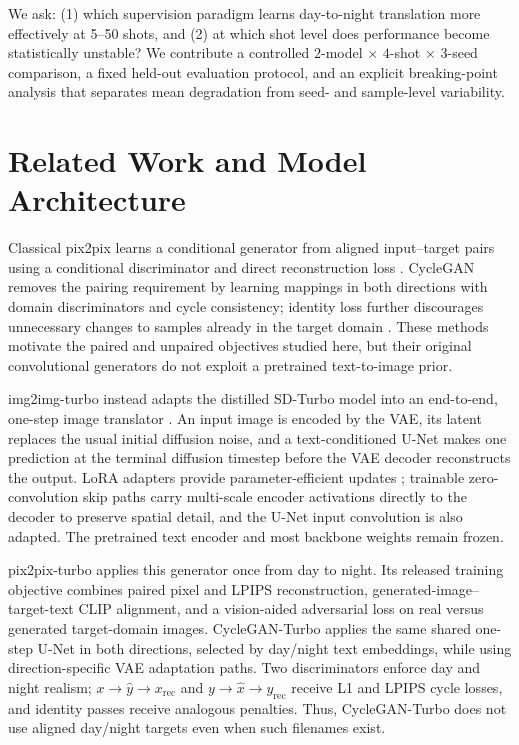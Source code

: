 \documentclass{article}
\begin{document}
We ask: (1) which supervision paradigm learns day-to-night translation more effectively at 5--50 shots, and (2) at which shot level does performance become statistically unstable? We contribute a controlled $2$-model $\times$ $4$-shot $\times$ $3$-seed comparison, a fixed held-out evaluation protocol, and an explicit breaking-point analysis that separates mean degradation from seed- and sample-level variability.

\section{Related Work and Model Architecture}

Classical pix2pix learns a conditional generator from aligned input--target pairs using a conditional discriminator and direct reconstruction loss \cite{isola2017image}. CycleGAN removes the pairing requirement by learning mappings in both directions with domain discriminators and cycle consistency; identity loss further discourages unnecessary changes to samples already in the target domain \cite{zhu2017unpaired}. These methods motivate the paired and unpaired objectives studied here, but their original convolutional generators do not exploit a pretrained text-to-image prior.

img2img-turbo instead adapts the distilled SD-Turbo model into an end-to-end, one-step image translator \cite{parmar2024one,sauer2023adversarial}. An input image is encoded by the VAE, its latent replaces the usual initial diffusion noise, and a text-conditioned U-Net makes one prediction at the terminal diffusion timestep before the VAE decoder reconstructs the output. LoRA adapters provide parameter-efficient updates \cite{hu2021lora}; trainable zero-convolution skip paths carry multi-scale encoder activations directly to the decoder to preserve spatial detail, and the U-Net input convolution is also adapted. The pretrained text encoder and most backbone weights remain frozen.

pix2pix-turbo applies this generator once from day to night. Its released training objective combines paired pixel and LPIPS reconstruction, generated-image--target-text CLIP alignment, and a vision-aided adversarial loss on real versus generated target-domain images. CycleGAN-Turbo applies the same shared one-step U-Net in both directions, selected by day/night text embeddings, while using direction-specific VAE adaptation paths. Two discriminators enforce day and night realism; $x\!\rightarrow\!\hat y\!\rightarrow\!x_{\mathrm{rec}}$ and $y\!\rightarrow\!\hat x\!\rightarrow\!y_{\mathrm{rec}}$ receive L1 and LPIPS cycle losses, and identity passes receive analogous penalties. Thus, CycleGAN-Turbo does not use aligned day/night targets even when such filenames exist.
\end{document}
